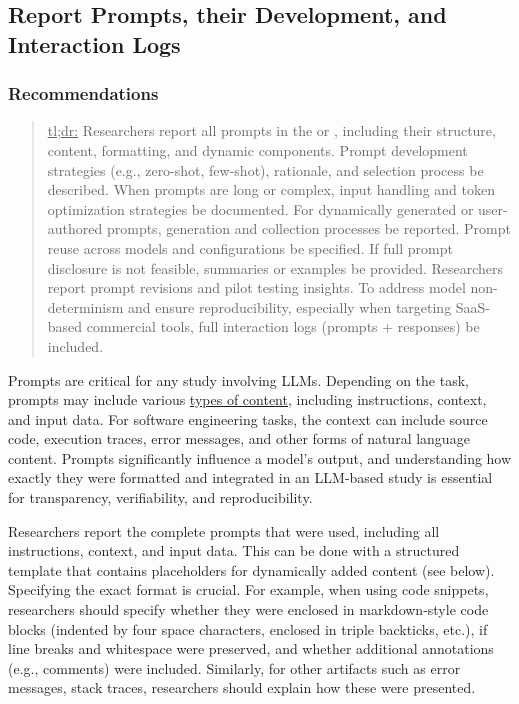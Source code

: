 



\subsection{Report Prompts, their Development, and Interaction Logs}


\subsubsection{Recommendations}

\begin{quote}
\underline{tl;dr:} Researchers \must report all prompts in the \paper or \supplementarymaterial, including their structure, content, formatting, and dynamic components. Prompt development strategies (e.g., zero-shot, few-shot), rationale, and selection process \must be described. When prompts are long or complex, input handling and token optimization strategies \must be documented. For dynamically generated or user-authored prompts, generation and collection processes \must be reported. Prompt reuse across models and configurations \must be specified. If full prompt disclosure is not feasible, summaries or examples \should be provided. Researchers \should report prompt revisions and pilot testing insights. To address model non-determinism and ensure reproducibility, especially when targeting SaaS-based commercial tools, full interaction logs (prompts + responses) \should be included.
\end{quote}

Prompts are critical for any study involving LLMs.
Depending on the task, prompts may include various \href{https://www.promptingguide.ai/introduction/elements}{types of content}, including instructions, context, and input data.
For software engineering tasks, the context can include source code, execution traces, error messages, and other forms of natural language content.
Prompts significantly influence a model’s output, and understanding how exactly they were formatted and integrated in an LLM-based study is essential for transparency, verifiability, and reproducibility.

Researchers \must report the complete prompts that were used, including all instructions, context, and input data.
This can be done with a structured template that contains placeholders for dynamically added content (see below).
Specifying the exact format is crucial.
For example, when using code snippets, researchers should specify whether they were enclosed in markdown-style code blocks (indented by four space characters, enclosed in triple backticks, etc.), if line breaks and whitespace were preserved, and whether additional annotations (e.g., comments) were included.
Similarly, for other artifacts such as error messages, stack traces, researchers should explain how these were presented.

